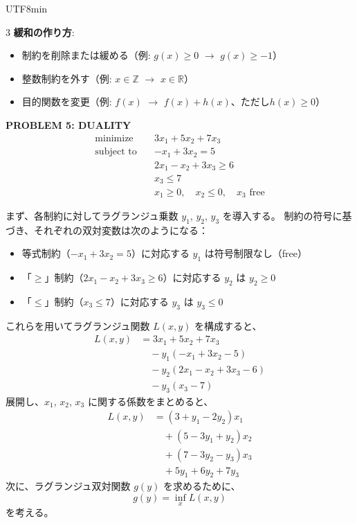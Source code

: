 \documentclass[8pt,a4paper]{article}
\newcommand{\mysection}[1]{\vspace{2pt}\textbf{#1}\vspace{1pt}}
\begin{document}
\begin{CJK}{UTF8}{min}
\begin{multicols}{3}
\textbf{緩和の作り方}:
\begin{itemize}
    \item 制約を削除または緩める（例: $g(x) \geq 0$ $\to$ $g(x) \geq -1$）
    \item 整数制約を外す（例: $x \in \mathbb{Z}$ $\to$ $x \in \mathbb{R}$）
    \item 目的関数を変更（例: $f(x)$ $\to$ $f(x) + h(x)$、ただし$h(x) \geq 0$）
\end{itemize}

\mysection{PROBLEM 5: DUALITY}
\begin{align*}
\text{minimize} \quad & 3x_1 + 5x_2 + 7x_3 \\
\text{subject to} \quad & -x_1 + 3x_2 = 5 \\
& 2x_1 - x_2 + 3x_3 \geq 6 \\
& x_3 \leq 7 \\
& x_1 \geq 0, \quad x_2 \leq 0, \quad x_3 \text{ free}
\end{align*}

まず、各制約に対してラグランジュ乗数 $y_1$, $y_2$, $y_3$ を導入する。
制約の符号に基づき、それぞれの双対変数は次のようになる：
\begin{itemize}
    \item 等式制約（$-x_1 + 3x_2 = 5$）に対応する $y_1$ は符号制限なし（free）
    \item 「$\geq$」制約（$2x_1 - x_2 + 3x_3 \geq 6$）に対応する $y_2$ は $y_2 \geq 0$
    \item 「$\leq$」制約（$x_3 \leq 7$）に対応する $y_3$ は $y_3 \leq 0$
\end{itemize}
これらを用いてラグランジュ関数 $L(x, y)$ を構成すると、
\begin{align*}
L(x, y) &= 3x_1 + 5x_2 + 7x_3 \\
&\quad - y_1(-x_1 + 3x_2 - 5) \\
&\quad - y_2(2x_1 - x_2 + 3x_3 - 6) \\
&\quad - y_3(x_3 - 7)
\end{align*}
展開し、$x_1$, $x_2$, $x_3$ に関する係数をまとめると、
\begin{align*}
L(x,y) &= (3 + y_1 - 2y_2)x_1 \\
&\quad + (5 - 3y_1 + y_2)x_2 \\
&\quad + (7 - 3y_2 - y_3)x_3 \\
&\quad + 5y_1 + 6y_2 + 7y_3
\end{align*}
次に、ラグランジュ双対関数 $g(y)$ を求めるために、
\[
g(y) = \inf_x L(x,y)
\]
を考える。


\end{multicols}
\end{CJK}
\end{document}

